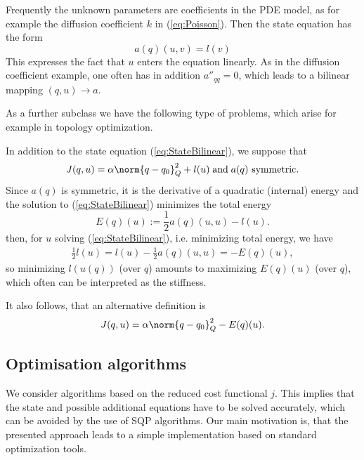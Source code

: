 %
\begin{example}\label{example:BilinearProblem}
Frequently the unknown parameters are coefficients in the PDE model, as for example the diffusion coefficient $k$ in 
(\ref{eq:Poisson}). Then the state equation has the form
%
\begin{equation}\label{eq:StateBilinear}
a(q)(u, v) = l(v)
\end{equation}
%
This expresses the fact that $u$ enters the equation linearly. As in the diffusion coefficient example, one often has in addition $a''_{qq}=0$, which leads to a bilinear mapping $(q,u)\to a$.
\end{example}
%
As a further subclass we have the following type of problems, which arise for example in topology optimization.
%
\begin{example}\label{example:ComplianceProblem}
In addition to the state equation (\ref{eq:StateBilinear}), we suppose that
%
\begin{equation}\label{eq:CostCompliance}
J(q,u) = \alpha \norm{q-q_0}_Q^2 +  l(u) \;\mbox{and}\; \mbox{$a(q)$ symmetric}.
\end{equation}
%
Since $a(q)$ is symmetric, it is the derivative of a quadratic (internal) energy and the solution to 
(\ref{eq:StateBilinear}) minimizes the total energy
%
\begin{equation}\label{eq:}
E(q)(u) := \frac12a(q)(u,u) - l(u).
\end{equation}
%
then, for $u$ solving (\ref{eq:StateBilinear}), i.e. minimizing total energy, we have 
%
\begin{align*}
\frac12 l(u) =  l(u) - \frac12 a(q)(u, u) =   - E(q)(u),
\end{align*}
%
so minimizing $l(u(q))$ (over $q$) amounts to maximizing $E(q)(u)$ (over $q$), which often can be interpreted as the stiffness.

It also follows, that an alternative definition is
\begin{equation}\label{eq:CostCompliance2}
J(q,u) = \alpha \norm{q-q_0}_Q^2- E(q)(u).
\end{equation}
\end{example}
%
\subsection{Optimisation algorithms}\label{subsec:OptimizationAlgorithms}
%
We consider algorithms based on the reduced cost functional $j$. This implies that the state and possible additional equations have to be solved accurately, which can be avoided by the use of SQP algorithms. 
Our main motivation is, that the presented approach leads to a simple implementation based on standard optimization tools.

